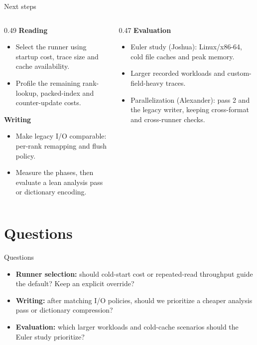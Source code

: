 \documentclass[aspectratio=169,11pt]{beamer}
\begin{document}
\begin{frame}{Next steps}
\begin{columns}[T]
\begin{column}{0.49\textwidth}
\small
\textbf{Reading}
\begin{itemize}
\item Select the runner using startup cost, trace size and cache availability.
\item Profile the remaining rank-lookup, packed-index and counter-update costs.
\end{itemize}
\vspace{3mm}
\textbf{Writing}
\begin{itemize}
\item Make legacy I/O comparable: per-rank remapping and flush policy.
\item Measure the phases, then evaluate a lean analysis pass or dictionary encoding.
\end{itemize}
\end{column}
\begin{column}{0.47\textwidth}
\small
\textbf{Evaluation}
\begin{itemize}
\item Euler study (Joshua): Linux/x86-64, cold file caches and peak memory.
\item Larger recorded workloads and custom-field-heavy traces.
\item Parallelization (Alexander): pass 2 and the legacy writer, keeping cross-format and cross-runner checks.
\end{itemize}
\end{column}
\end{columns}
\end{frame}

\section{Questions}

\begin{frame}{Questions}
\begin{itemize}
\item \textbf{Runner selection:} should cold-start cost or repeated-read throughput guide the default? Keep an explicit override?
\vspace{4mm}
\item \textbf{Writing:} after matching I/O policies, should we prioritize a cheaper analysis pass or dictionary compression?
\vspace{4mm}
\item \textbf{Evaluation:} which larger workloads and cold-cache scenarios should the Euler study prioritize?
\end{itemize}
\end{frame}
\end{document}
